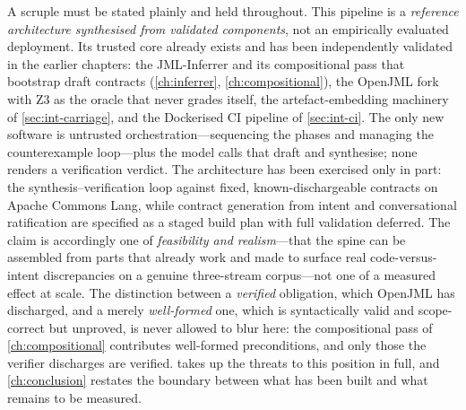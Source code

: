 A scruple must be stated plainly and held throughout. This pipeline is a
\emph{reference architecture synthesised from validated components}, not an
empirically evaluated deployment. Its trusted core already exists and has been
independently validated in the earlier chapters: the JML-Inferrer and its
compositional pass that bootstrap draft contracts (\cref{ch:inferrer},
\cref{ch:compositional}), the OpenJML fork with Z3 as the oracle that never grades
itself, the artefact-embedding machinery of \cref{sec:int-carriage}, and the
Dockerised CI pipeline of \cref{sec:int-ci}. The only new software is untrusted
orchestration---sequencing the phases and managing the counterexample loop---plus
the model calls that draft and synthesise; none renders a verification verdict.
The architecture has been exercised only in part: the synthesis--verification loop
against fixed, known-dischargeable contracts on Apache Commons Lang, while contract
generation from intent and conversational ratification are specified as a staged
build plan with full validation deferred. The claim is accordingly one of
\emph{feasibility and realism}---that the spine can be assembled from parts that
already work and made to surface real code-versus-intent discrepancies on a genuine
three-stream corpus---not one of a measured effect at scale. The distinction
between a \emph{verified} obligation, which OpenJML has discharged, and a merely
\emph{well-formed} one, which is syntactically valid and scope-correct but
unproved, is never allowed to blur here: the compositional pass of
\cref{ch:compositional} contributes well-formed preconditions, and only those the
verifier discharges are verified.  takes up the threats to this
position in full, and \cref{ch:conclusion} restates the boundary between what has
been built and what remains to be measured.
